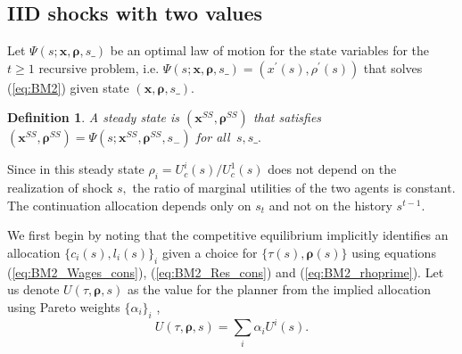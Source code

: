 \documentclass[thmsb,11pt]{article}
\newtheorem{definition}{Definition}
\begin{document}
\subsection{IID shocks with two values}
Let $\Psi \left( s;\bm{x},\bm{\rho },s\_\right) $ be an optimal  law of motion for the state variables
for the $t\geq1$ recursive problem, i.e. $\Psi \left( s;\bm{x},%
\bm{\rho },s\_\right) =\left( x^{\prime }\left( s\right) ,\rho ^{\prime
}\left( s\right) \right) $ that solves (\ref{eq:BM2}) given state $\left(
\bm{x},\bm{\rho },s\_\right) .$ 
\begin{definition}
 A steady state is $\left( \bm{x}^{SS},\bm{\rho} ^{SS}\right) $ that satisfies $\left(\bm{ x}^{SS},\bm{\rho}
^{SS}\right) =\Psi \left( s;\bm{x}^{SS},\bm{\rho} ^{SS},s_{-}\right) $ for all $%
\,s,s\_.$ 
\end{definition}
Since in this steady state $\rho_i =U_{c}^{i}(s)/U_{c}^{1}(s)$ does
not depend on the realization of shock $s,$ the ratio of marginal utilities
of the two agents is constant. The continuation allocation depends only on  $s_{t}$ and not on the  history $s^{t-1}$.%

We first begin by noting that the competitive equilibrium implicitly identifies an allocation $\{c_i(s),l_i(s)\}_{i}$ given a choice for $\{\tau(s), \bm{\rho}(s)\}$ using equations (\ref{eq:BM2_Wages_cons}), (\ref{eq:BM2_Res_cons}) and (\ref{eq:BM2_rhoprime}).  Let us denote $U(\tau,\bm{\rho},s)$ as the value for the planner from the implied allocation using Pareto weights $\{\alpha_i\}_i$ , 
\[U(\tau,\bm{\rho},s)=\sum_{i}\alpha_i U^i(s).\]
\end{document}

